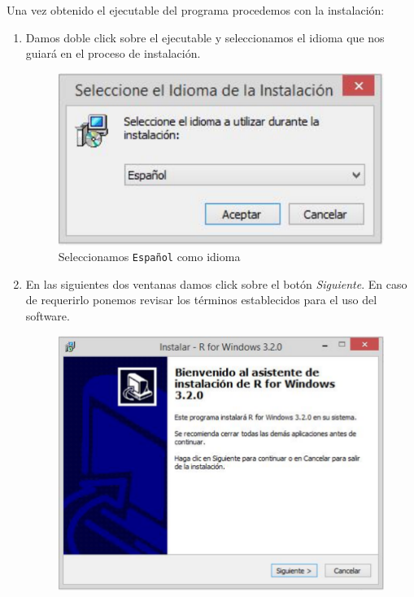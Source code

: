 \documentclass[11pt,a4paper,oneside]{book}\usepackage[]{graphicx}\usepackage[]{color}
\begin{document}
Una vez obtenido el ejecutable del programa procedemos con la instalación:
\begin{enumerate}
   \item Damos doble click sobre el ejecutable y seleccionamos el idioma que nos guiará en el proceso de instalación.
   \begin{figure}[H]
    \centering
    \includegraphics[scale=0.6]{figuras/r01.pdf}
    \caption{Seleccionamos \texttt{Español} como idioma}
  \end{figure}
   \item En las siguientes dos ventanas damos click sobre el botón \emph{Siguiente}. En caso de requerirlo ponemos revisar los términos establecidos para el uso del software.
   \begin{figure}[H]
    \centering
    \includegraphics[scale=0.54]{figuras/r02.pdf}\qquad

\end{figure}
\end{enumerate}
\end{document}
